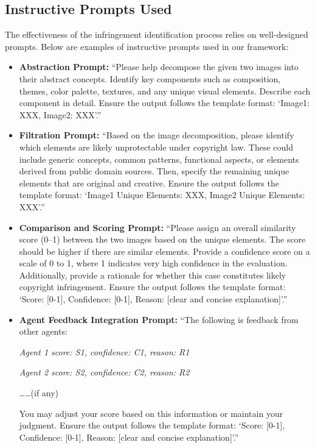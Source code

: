 \subsection{Instructive Prompts Used}
\label{promptA}
The effectiveness of the infringement identification process relies on well-designed prompts. Below are examples of instructive prompts used in our framework:

\begin{itemize}
    \item \textbf{Abstraction Prompt:}  
    ``Please help decompose the given two images into their abstract concepts. Identify key components such as composition, themes, color palette, textures, and any unique visual elements. Describe each component in detail.  
    Ensure the output follows the template format: `Image1: XXX, Image2: XXX'.''

    \item \textbf{Filtration Prompt:}  
    ``Based on the image decomposition, please identify which elements are likely unprotectable under copyright law. These could include generic concepts, common patterns, functional aspects, or elements derived from public domain sources. Then, specify the remaining unique elements that are original and creative.  
    Ensure the output follows the template format: `Image1 Unique Elements: XXX, Image2 Unique Elements: XXX'.''

    \item \textbf{Comparison and Scoring Prompt:}  
    ``Please assign an overall similarity score (0–1) between the two images based on the unique elements. The score should be higher if there are similar elements. Provide a confidence score on a scale of 0 to 1, where 1 indicates very high confidence in the evaluation. Additionally, provide a rationale for whether this case constitutes likely copyright infringement. Ensure the output follows the template format: `Score: [0-1], Confidence: [0-1], Reason: [clear and concise explanation]'.''

    \item \textbf{Agent Feedback Integration Prompt:}  
    ``The following is feedback from other agents: 
    
    \textit{Agent 1 score: S1, confidence: C1, reason: R1}  
    
    \textit{Agent 2 score: S2, confidence: C2, reason: R2}

    ……(if any)
    
    You may adjust your score based on this information or maintain your judgment. Ensure the output follows the template format:  `Score: [0-1], Confidence: [0-1], Reason: [clear and concise explanation]'.''


\end{itemize}
